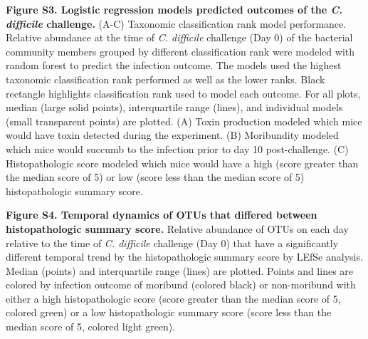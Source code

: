 \documentclass[
  12pt,
]{article}
\begin{document}
\textbf{Figure S3. Logistic regression models predicted outcomes of the
\emph{C. difficile} challenge.} (A-C) Taxonomic classification rank
model performance. Relative abundance at the time of \emph{C. difficile}
challenge (Day 0) of the bacterial community members grouped by
different classification rank were modeled with random forest to predict
the infection outcome. The models used the highest taxonomic
classification rank performed as well as the lower ranks. Black
rectangle highlights classification rank used to model each outcome. For
all plots, median (large solid points), interquartile range (lines), and
individual models (small transparent points) are plotted. (A) Toxin
production modeled which mice would have toxin detected during the
experiment. (B) Moribundity modeled which mice would succumb to the
infection prior to day 10 post-challenge. (C) Histopathologic score
modeled which mice would have a high (score greater than the median
score of 5) or low (score less than the median score of 5)
histopathologic summary score.

\hfill\break

\textbf{Figure S4. Temporal dynamics of OTUs that differed between
histopathologic summary score.} Relative abundance of OTUs on each day
relative to the time of \emph{C. difficile} challenge (Day 0) that have
a significantly different temporal trend by the histopathologic summary
score by LEfSe analysis. Median (points) and interquartile range (lines)
are plotted. Points and lines are colored by infection outcome of
moribund (colored black) or non-moribund with either a high
histopathologic score (score greater than the median score of 5, colored
green) or a low histopathologic summary score (score less than the
median score of 5, colored light green).
\end{document}
